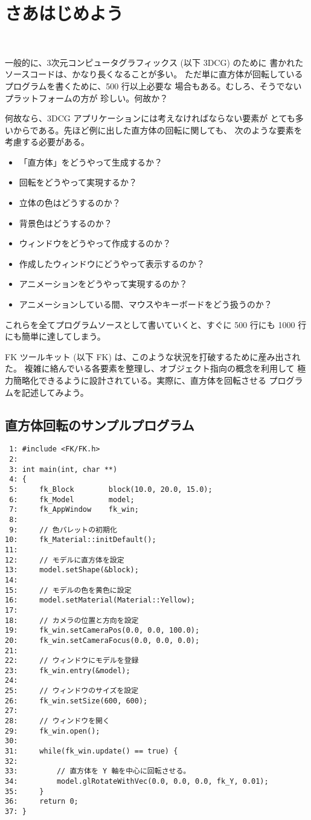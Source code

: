 \chapter{さあはじめよう} \label{chap:intro} ~

一般的に、3次元コンピュータグラフィックス (以下 3DCG) のために
書かれたソースコードは、かなり長くなることが多い。
ただ単に直方体が回転しているプログラムを書くために、500 行以上必要な
場合もある。むしろ、そうでないプラットフォームの方が
珍しい。何故か？

何故なら、3DCG アプリケーションには考えなければならない要素が
とても多いからである。先ほど例に出した直方体の回転に関しても、
次のような要素を考慮する必要がある。
\begin{itemize}
 \item 「直方体」をどうやって生成するか？
 \item 回転をどうやって実現するか？
 \item 立体の色はどうするのか？
 \item 背景色はどうするのか？
 \item ウィンドウをどうやって作成するのか？
 \item 作成したウィンドウにどうやって表示するのか？
 \item アニメーションをどうやって実現するのか？
 \item アニメーションしている間、マウスやキーボードをどう扱うのか？
\end{itemize}
これらを全てプログラムソースとして書いていくと、すぐに 500 行にも
1000 行にも簡単に達してしまう。

FK ツールキット (以下 FK) は、このような状況を打破するために産み出された。
複雑に絡んでいる各要素を整理し、オブジェクト指向の概念を利用して
極力簡略化できるように設計されている。実際に、直方体を回転させる
プログラムを記述してみよう。
\section{直方体回転のサンプルプログラム}
\begin{breakbox}
\begin{small}
\begin{verbatim}
 1: #include <FK/FK.h>
 2: 
 3: int main(int, char **)
 4: {
 5:     fk_Block        block(10.0, 20.0, 15.0);
 6:     fk_Model        model;
 7:     fk_AppWindow    fk_win;
 8: 
 9:     // 色パレットの初期化
10:     fk_Material::initDefault();          
11: 
12:     // モデルに直方体を設定
13:     model.setShape(&block);
14: 
15:     // モデルの色を黄色に設定
16:     model.setMaterial(Material::Yellow);
17: 
18:     // カメラの位置と方向を設定
19:     fk_win.setCameraPos(0.0, 0.0, 100.0);
20:     fk_win.setCameraFocus(0.0, 0.0, 0.0);
21: 
22:     // ウィンドウにモデルを登録
23:     fk_win.entry(&model);
24: 
25:     // ウィンドウのサイズを設定
26:     fk_win.setSize(600, 600);
27: 
28:     // ウィンドウを開く
29:     fk_win.open();
30: 
31:     while(fk_win.update() == true) {
32: 
33:         // 直方体を Y 軸を中心に回転させる。
34:         model.glRotateWithVec(0.0, 0.0, 0.0, fk_Y, 0.01);
35:     }
36:     return 0;
37: }
\end{verbatim}
\end{small}
\end{breakbox}

